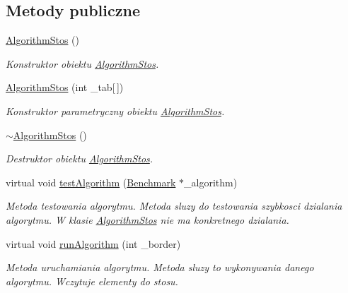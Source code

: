 \subsection*{Metody publiczne}
\begin{DoxyCompactItemize}
\item 
\hyperlink{class_algorithm_stos_a0d987377d7c5d9cea3152680ba437cd3}{Algorithm\-Stos} ()
\begin{DoxyCompactList}\small\item\em Konstruktor obiektu \hyperlink{class_algorithm_stos}{Algorithm\-Stos}. \end{DoxyCompactList}\item 
\hyperlink{class_algorithm_stos_a5dc7ad87d403c67d64aa6cac6a626992}{Algorithm\-Stos} (int \-\_\-tab\mbox{[}$\,$\mbox{]})
\begin{DoxyCompactList}\small\item\em Konstruktor parametryczny obiektu \hyperlink{class_algorithm_stos}{Algorithm\-Stos}. \end{DoxyCompactList}\item 
\hyperlink{class_algorithm_stos_a68a3733d5dfd9fefe38059f0ce0202bf}{$\sim$\-Algorithm\-Stos} ()
\begin{DoxyCompactList}\small\item\em Destruktor obiektu \hyperlink{class_algorithm_stos}{Algorithm\-Stos}. \end{DoxyCompactList}\item 
virtual void \hyperlink{class_algorithm_stos_a7fb987baf970d51f90ad880d27e537a4}{test\-Algorithm} (\hyperlink{class_benchmark}{Benchmark} $\ast$\-\_\-algorithm)
\begin{DoxyCompactList}\small\item\em Metoda testowania algorytmu. Metoda sluzy do testowania szybkosci dzialania algorytmu. W klasie \hyperlink{class_algorithm_stos}{Algorithm\-Stos} nie ma konkretnego dzialania. \end{DoxyCompactList}\item 
virtual void \hyperlink{class_algorithm_stos_a889f7150ae3651b40e5acca7542dbbd1}{run\-Algorithm} (int \-\_\-border)
\begin{DoxyCompactList}\small\item\em Metoda uruchamiania algorytmu. Metoda sluzy to wykonywania danego algorytmu. Wczytuje elementy do stosu. \end{DoxyCompactList}\end{DoxyCompactItemize}
